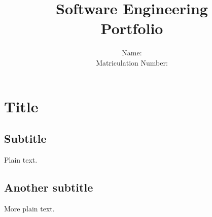 \documentclass[a4paper,11pt,draft]{article}
\title{
   Software Engineering \\
   Portfolio
}
\author{
   Name: \\
   Matriculation Number:
}
\begin{document}
\maketitle

\section{Title}

\subsection{Subtitle}

Plain text.

\subsection{Another subtitle}

More plain text.
\end{document}
